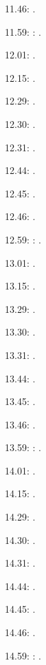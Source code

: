 \documentclass[italian]{article}
\begin{document}
11.46:   .

11.59:   
:   .

12.01:    . 

12.15:    . 

12.29:    . 

12.30:    .

12.31:    .

12.44:    .

12.45:    .

12.46:    .

12.59:    
:    . 

13.01:     . 

13.15:     . 

13.29:     . 

13.30:     .

13.31:     .

13.44:     .

13.45:     .

13.46:     .

13.59:     
:    .

14.01:     . 

14.15:     . 

14.29:     . 

14.30:     .

14.31:     .

14.44:     .

14.45:     .

14.46:     .

14.59:     
:    .
\end{document}
